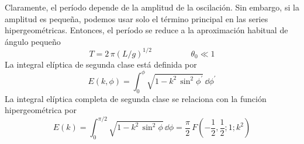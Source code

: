 Claramente, el período depende de la amplitud de la oscilación. Sin embargo, si la amplitud es pequeña, podemos usar solo el término principal en las series hipergeométricas. Entonces, el período se reduce a la aproximación habitual de ángulo pequeño
\[ T = 2 \, \pi (L / g)^{1/2} \hspace{2cm} \theta_{0} \ll 1 \]
La integral elíptica de segunda clase está definida por
\[ E (k, \phi) = \int_{0}^{\phi} \sqrt{1 - k^{2} \, \sin^{2} \phi^{\prime}} \, \dd \phi^{\prime} \]
La integral elíptica completa de segunda clase se relaciona con la función hipergeométrica por
\begin{equation}
E(k) = \int_{0}^{\pi/2} \sqrt{1 - k^{2} \, \sin^{2} \phi} \, \dd \phi =  \dfrac{\pi}{2} \, F \left( -\frac{1}{2}, \frac{1}{2}; 1; k^{2} \right)
\end{equation}

